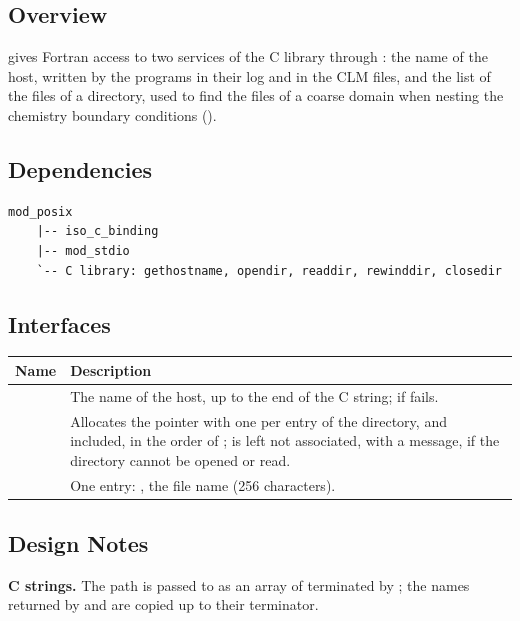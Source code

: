 \subsection{Overview}

 gives Fortran access to two services of the C library
through : the name of the host, written by the
programs in their log and in the CLM files, and the list of the files of a
directory, used to find the files of a coarse domain when nesting the
chemistry boundary conditions ().

\subsection{Dependencies}

\begin{lstlisting}
mod_posix
    |-- iso_c_binding
    |-- mod_stdio
    `-- C library: gethostname, opendir, readdir, rewinddir, closedir
\end{lstlisting}

\subsection{Interfaces}

\begin{longtable}{L{5cm} L{9cm}}
  \toprule
  \textbf{Name} & \textbf{Description} \\
  \midrule
  \endhead
  \bottomrule
  \endfoot
   &
    The name of the host, up to the end of the C string;  if
     fails. \\
   &
    Allocates the pointer  with one  per entry of
    the directory,  and  included, in the order of
    ;  is left not associated, with a message, if
    the directory cannot be opened or read. \\
   &
    One entry: , the file name (256 characters). \\
\end{longtable}

\subsection{Design Notes}

\textbf{C strings.} The path is passed to  as an array of
 terminated by ; the names returned by
 and  are copied up to their terminator.

